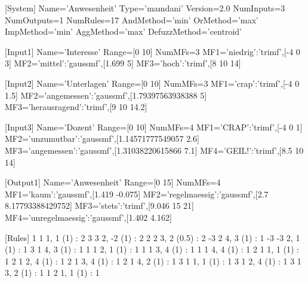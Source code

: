 [System]
Name='Anwesenheit'
Type='mamdani'
Version=2.0
NumInputs=3
NumOutputs=1
NumRules=17
AndMethod='min'
OrMethod='max'
ImpMethod='min'
AggMethod='max'
DefuzzMethod='centroid'

[Input1]
Name='Interesse'
Range=[0 10]
NumMFs=3
MF1='niedrig':'trimf',[-4 0 3]
MF2='mittel':'gaussmf',[1.699 5]
MF3='hoch':'trimf',[8 10 14]

[Input2]
Name='Unterlagen'
Range=[0 10]
NumMFs=3
MF1='crap':'trimf',[-4 0 1.5]
MF2='angemessen':'gaussmf',[1.79397563938388 5]
MF3='herausragend':'trimf',[9 10 14.2]

[Input3]
Name='Dozent'
Range=[0 10]
NumMFs=4
MF1='CRAP':'trimf',[-4 0 1]
MF2='unzumutbar':'gaussmf',[1.14571777549057 2.6]
MF3='angemessen':'gaussmf',[1.31038220615866 7.1]
MF4='GEIL!':'trimf',[8.5 10 14]

[Output1]
Name='Anwesenheit'
Range=[0 15]
NumMFs=4
MF1='kaum':'gaussmf',[1.419 -0.075]
MF2='regelmaessig':'gaussmf',[2.7 8.17793388429752]
MF3='stets':'trimf',[9.046 15 21]
MF4='unregelmaessig':'gaussmf',[1.402 4.162]

[Rules]
1 1 1, 1 (1) : 2
3 3 2, -2 (1) : 2
2 2 3, 2 (0.5) : 2
-3 2 4, 3 (1) : 1
-3 -3 2, 1 (1) : 1
3 1 4, 3 (1) : 1
1 1 2, 1 (1) : 1
1 1 3, 4 (1) : 1
1 1 4, 4 (1) : 1
2 1 1, 1 (1) : 1
2 1 2, 4 (1) : 1
2 1 3, 4 (1) : 1
2 1 4, 2 (1) : 1
3 1 1, 1 (1) : 1
3 1 2, 4 (1) : 1
3 1 3, 2 (1) : 1
1 2 1, 1 (1) : 1
